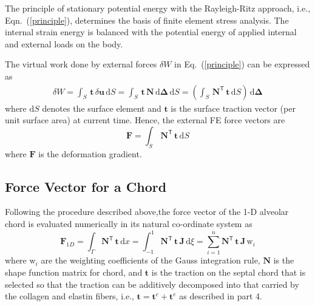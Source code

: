 

The principle of stationary potential energy with the Rayleigh-Ritz approach, i.e., Eqn.~(\ref{principle}), determines the basis of finite element stress analysis. The internal strain energy is balanced with the potential energy of applied internal and external loads on the body.

The virtual work done by external forces $\delta{W}$ in Eq.~(\ref{principle}) can be expressed as
\begin{equation}
\begin{aligned}
\delta{W} = \int_{S} \, \mathbf{t} \, \delta \mathbf{u} \, \mathrm{d} S
= \int_{S} \, \mathbf{t} \, \mathbf{N} \, \mathrm{d} \boldsymbol{\Delta} \, \mathrm{d} S
= \left( \int_{S} \, \mathbf{N}^{\mathsf{T}} \, \mathbf{t} \, \mathrm{d} S \right) \, \mathrm{d} \boldsymbol{\Delta}
\end{aligned}
\end{equation}
where $\mathrm{d} S$ denotes the surface element and $\mathbf{t}$ is the surface traction vector (per unit surface area) at current time. Hence, the external FE force vectors are
\begin{equation}
\mathbf{F} = \int_{S} \, \mathbf{N}^{\mathsf{T}} \, \mathbf{t} \, \mathrm{d} S 
\end{equation}
where $ \mathbf{F} $ is the deformation gradient.


\subsection{Force Vector for a Chord}

Following the procedure described above,the force vector of the 1-D alveolar chord is evaluated numerically in its natural co-ordinate system as
\begin{equation}
\mathbf{F}_{1D} = \int_{\Gamma} \mathbf{N}^{\mathsf{T}} \, \mathbf{t} \, \mathrm{d} x  = \int_{-1}^{1} \mathbf{N}^{\mathsf{T}}\, \mathbf{t} \, \mathbf{J}\,  \mathrm{d} \xi =  \sum_{i=1}^{n} \mathbf{N}^{\mathsf{T}} \, \mathbf{t} \, \mathbf{J} \, \mathrm{w}_i
\end{equation}
where $\mathrm{w}_i$ are the  weighting coefficients of the Gauss integration rule, $\mathbf{N}$ is the shape function matrix for chord, and $\mathbf{t}$ is the traction on the septal chord that is selected so that the traction can be additively decomposed into that carried by the collagen and elastin fibers, i.e., $\mathbf{t} = \mathbf{t}^c + \mathbf{t}^e $ as described in part 4.

